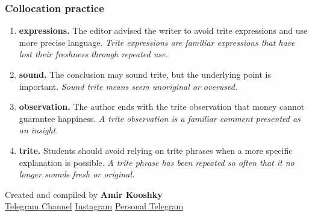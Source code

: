 \documentclass[11pt]{article}
\begin{document}
\subsubsection{Collocation practice}
\begin{enumerate}
  \item \textbf{expressions.} The editor advised the writer to avoid trite expressions and use more precise language. \emph{Trite expressions are familiar expressions that have lost their freshness through repeated use.}
  \item \textbf{sound.} The conclusion may sound trite, but the underlying point is important. \emph{Sound trite means seem unoriginal or overused.}
  \item \textbf{observation.} The author ends with the trite observation that money cannot guarantee happiness. \emph{A trite observation is a familiar comment presented as an insight.}
  \item \textbf{trite.} Students should avoid relying on trite phrases when a more specific explanation is possible. \emph{A trite phrase has been repeated so often that it no longer sounds fresh or original.}
\end{enumerate}

\vfill
\begin{center}
\small\color{Muted} Created and compiled by \textbf{Amir Kooshky}\\
\href{https://t.me/KooshkyTOEFL}{Telegram Channel}\quad\textbullet\quad
\href{https://www.instagram.com/kooshkytoefl}{Instagram}\quad\textbullet\quad
\href{https://t.me/KooshkyTOEFL\_pv}{Personal Telegram}
\end{center}
\end{document}
